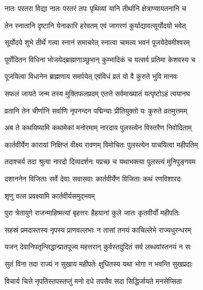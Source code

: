 \twolineshloka
{नातः परतरा विद्या नातः परतरं तपः}
{पृथिव्यां यानि तीर्थानि क्षेत्राण्यायतनानि च} %

\twolineshloka
{तेन स्नातानि दृष्टानि येनाकारि हरेवतम्}
{एवं जागरणं कुर्याद्यावत्सूर्योदयो भवेत्} %

\twolineshloka
{सूर्योदये शुभे तीर्थे गत्वा स्नानं समाचरेत्}
{स्नात्वा चामत्य भवनं पूजयेदेवमीश्वरम्} %

\twolineshloka
{पूर्वोदितन विधिना भोजयेद्ब्राह्मणाञ्छुभान्}
{कुम्भादिकं च यत्सर्व प्रतिमा केशवस्य च} %

\twolineshloka
{पूजयित्वा विधानेन ब्राह्मणाय समर्पयेत्}
{एवंविधं व्रतं यो वै कुरुते भुवि मानवः} %

\twolineshloka
{सफलं जायते जन्म तस्य मुक्तिफलप्रदम्}
{एतत्ते सर्वमाख्यातं यत्पृष्टोऽहं त्वयानघ} %

\twolineshloka
{व्रतानि तेन चीर्णानि सर्वाणि नृपनन्दन}
{पद्मिन्याः प्रीतियुक्तो यः कुरुते व्रतमुत्तमम्} %

\twolineshloka
{अब ते कथयिष्यामि कथामेकां मनोरमाम्}
{नारदाय पुलस्त्येन विस्तरैण निवोदिताम्} %

\twolineshloka
{कार्तवीर्येण कारायां निक्षिप्तं वीक्ष्य रावणम्}
{विमोचितः पुलस्त्येन याचयित्वा महीपतिम्} %

\twolineshloka
{तदाश्चर्य तदा श्रुत्वा नारदो दिव्यदर्शनः}
{पप्रच्छ च यथाभक्त्या पुलस्त्यं मुनिपुङ्गवम} %


\twolineshloka
{दशाननेन विजिताः सर्वे देवाः सवासवाः}
{कार्तवीर्येण विजिताः कथं रणविशारदः} %



\onelineshloka
{शृणु वत्स प्रवक्ष्यामि कार्तवीर्यसमुद्भवम्} %

\twolineshloka
{पुरा त्रेतायुगे राजन्माहिष्मत्यां बृहत्तरः}
{हैहयानां कुले जातः कृतवीर्यों महीपतिः} %

\twolineshloka
{सहस्रं प्रमदास्तस्य नृपस्य प्राणवल्लभाः}
{न तासां तनयं काचिल्लेभे राज्यधुरन्धरम्} %

\twolineshloka
{यजन् देवानिपतृन्सिद्धान्प्रातपूज्य महत्तरान्}
{कुर्वस्तदुदितं सर्व लब्धवांस्तनयं न सः} %

\twolineshloka
{सुतं विना तदा राज्यं न सुखाय महीपतेः}
{क्षुधितस्य यथा भोगा न भवन्ति सुखप्रदाः} %

\twolineshloka
{विचार्य चित्ते नृपतिस्तपस्तप्तुं मनो दधे}
{तपसैव सदा सिद्धिर्जायते मनसेप्सिता} %

